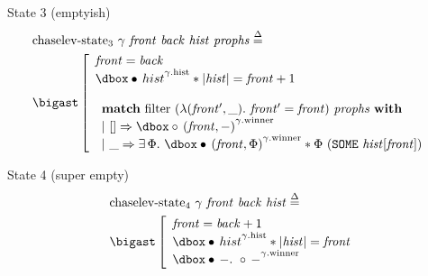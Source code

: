 \begin{frame}{State 3 (emptyish)}
\small
\begin{align*}
		&\mathrm{chaselev \mathhyphen state_3}\ \gamma\ \mathit{front}\ \mathit{back}\ \mathit{hist}\ \mathit{prophs}
		\eqdef
	\\
		&\iBigsep\left[\begin{array}{l}
				\mathit{front} = \mathit{back}
			\\
				\iGhost{\gamma\mathrm{.hist}}{\iAuth{hist}} \iSep
				| \mathit{hist} | = \mathit{front} + 1
			\\\\
				\begin{array}{l}
						\bold{match}\ \mathrm{filter}\ (\lambda (\mathit{front'}, \_) .\ \mathit{front'} = \mathit{front})\ \mathit{prophs}\ \bold{with}
					\\
						|\ [] \Rightarrow
						\iGhost{\gamma\mathrm{.winner}}{\iFrag{(\mathit{front}, -)}}
					\\
						|\ \_ \Rightarrow
						\exists \Phi .\ 
						\iGhost{\gamma\mathrm{.winner}}{\iAuth{(\mathit{front}, \Phi)}} \iSep
						\Phi\ (\exprSome{\mathit{hist} [\mathit{front}]})
				\end{array}
		\end{array}\right.
\end{align*}
\end{frame}


\begin{frame}{State 4 (super empty)}
\begin{align*}
		&\mathrm{chaselev \mathhyphen state_4}\ \gamma\ \mathit{front}\ \mathit{back}\ \mathit{hist}
		\eqdef
	\\
		&\iBigsep\left[\begin{array}{l}
				\mathit{front} = \mathit{back} + 1
			\\
				\iGhost{\gamma\mathrm{.hist}}{\iAuth{hist}} \iSep
				| \mathit{hist} | = \mathit{front}
			\\
				\iGhost{\gamma\mathrm{.winner}}{\iAuth{-} .\ \iFrag{-}}
		\end{array}\right.
\end{align*}
\end{frame}